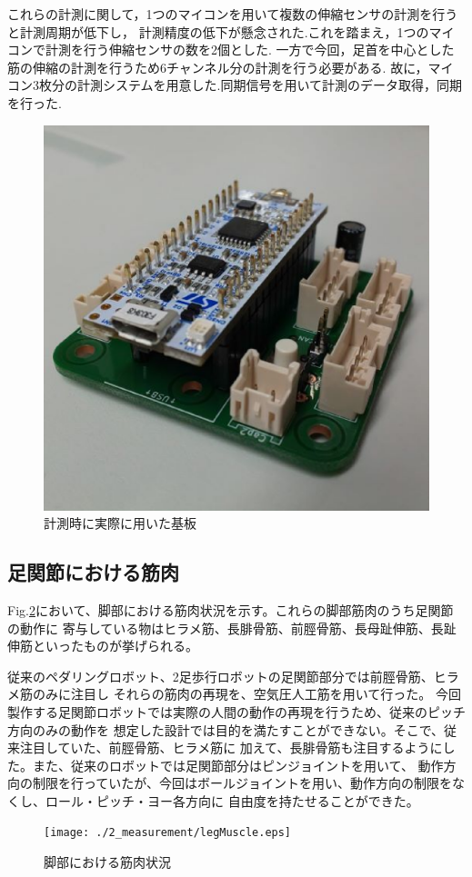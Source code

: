 これらの計測に関して，1つのマイコンを用いて複数の伸縮センサの計測を行うと計測周期が低下し，
計測精度の低下が懸念された.これを踏まえ，1つのマイコンで計測を行う伸縮センサの数を2個とした.
一方で今回，足首を中心とした筋の伸縮の計測を行うため6チャンネル分の計測を行う必要がある.
故に，マイコン3枚分の計測システムを用意した.同期信号を用いて計測のデータ取得，同期を行った.
\begin{figure}[h]
 \begin{center}
  \includegraphics[width=0.5\columnwidth,clip]{./2_measurement/circuit.eps}
  \caption{計測時に実際に用いた基板}
  \label{circuit}
 \end{center}
\end{figure}

\newpage

\subsection{足関節における筋肉}
Fig.\ref{legMuscle}において、脚部における筋肉状況を示す。これらの脚部筋肉のうち足関節の動作に
寄与している物はヒラメ筋、長腓骨筋、前脛骨筋、長母趾伸筋、長趾伸筋といったものが挙げられる。

従来のペダリングロボット、2足歩行ロボットの足関節部分では前脛骨筋、ヒラメ筋のみに注目し
それらの筋肉の再現を、空気圧人工筋を用いて行った。
今回製作する足関節ロボットでは実際の人間の動作の再現を行うため、従来のピッチ方向のみの動作を
想定した設計では目的を満たすことができない。そこで、従来注目していた、前脛骨筋、ヒラメ筋に
加えて、長腓骨筋も注目するようにした。また、従来のロボットでは足関節部分はピンジョイントを用いて、
動作方向の制限を行っていたが、今回はボールジョイントを用い、動作方向の制限をなくし、ロール・ピッチ・ヨー各方向に
自由度を持たせることができた。

\begin{figure}[h]
    \begin{center}
     \texttt{[image: ./2\_measurement/legMuscle.eps]}
     \caption{脚部における筋肉状況}
     \label{legMuscle}
    \end{center}
   \end{figure}